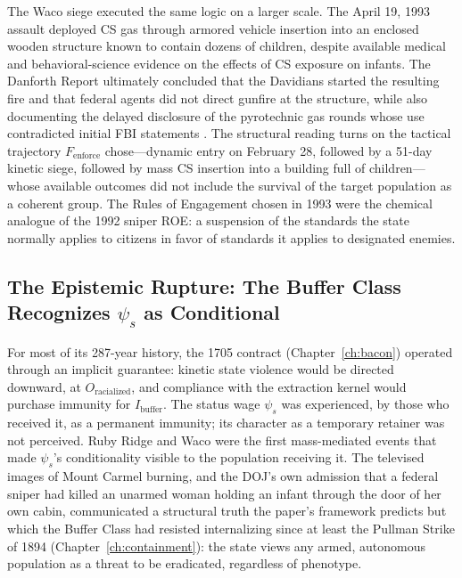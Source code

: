 The Waco siege executed the same logic on a larger scale. The April 19, 1993 assault deployed CS gas through armored vehicle insertion into an enclosed wooden structure known to contain dozens of children, despite available medical and behavioral-science evidence on the effects of CS exposure on infants. The Danforth Report ultimately concluded that the Davidians started the resulting fire and that federal agents did not direct gunfire at the structure, while also documenting the delayed disclosure of the pyrotechnic gas rounds whose use contradicted initial FBI statements \cite{danforth2000}. The structural reading turns on the tactical trajectory $F_{\text{enforce}}$ chose---dynamic entry on February 28, followed by a 51-day kinetic siege, followed by mass CS insertion into a building full of children---whose available outcomes did not include the survival of the target population as a coherent group. The Rules of Engagement chosen in 1993 were the chemical analogue of the 1992 sniper ROE: a suspension of the standards the state normally applies to citizens in favor of standards it applies to designated enemies.

\subsection{The Epistemic Rupture: The Buffer Class Recognizes $\psi_s$ as Conditional}
\label{subsec:epistemic_rupture}

For most of its 287-year history, the 1705 contract (Chapter~\ref{ch:bacon}) operated through an implicit guarantee: kinetic state violence would be directed downward, at $O_{\text{racialized}}$, and compliance with the extraction kernel would purchase immunity for $I_{\text{buffer}}$. The status wage $\psi_s$ was experienced, by those who received it, as a permanent immunity; its character as a temporary retainer was not perceived. Ruby Ridge and Waco were the first mass-mediated events that made $\psi_s$'s conditionality visible to the population receiving it. The televised images of Mount Carmel burning, and the DOJ's own admission that a federal sniper had killed an unarmed woman holding an infant through the door of her own cabin, communicated a structural truth the paper's framework predicts but which the Buffer Class had resisted internalizing since at least the Pullman Strike of 1894 (Chapter~\ref{ch:containment}): the state views any armed, autonomous population as a threat to be eradicated, regardless of phenotype.

